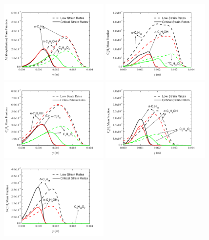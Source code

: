 \documentclass[preprint,3p,times,twocolumn]{elsarticleUS}
\begin{document}
\begin{figure}[ht]
  \centering
  \scriptsize
  \includegraphics[trim=4mm 8mm 30mm 20mm, clip=true, width=0.48\textwidth]{A2-y.png}
  \includegraphics[trim=4mm 8mm 30mm 20mm, clip=true, width=0.48\textwidth]{C9H7-y.png}
  \includegraphics[trim=4mm 8mm 30mm 20mm, clip=true, width=0.48\textwidth]{A1-y.png}
  \includegraphics[trim=4mm 8mm 30mm 20mm, clip=true, width=0.48\textwidth]{C5H5-y.png}
  \includegraphics[trim=4mm 8mm 30mm 20mm, clip=true, width=0.48\textwidth]{P-C4H8-y.png}

\end{figure}
\end{document}
